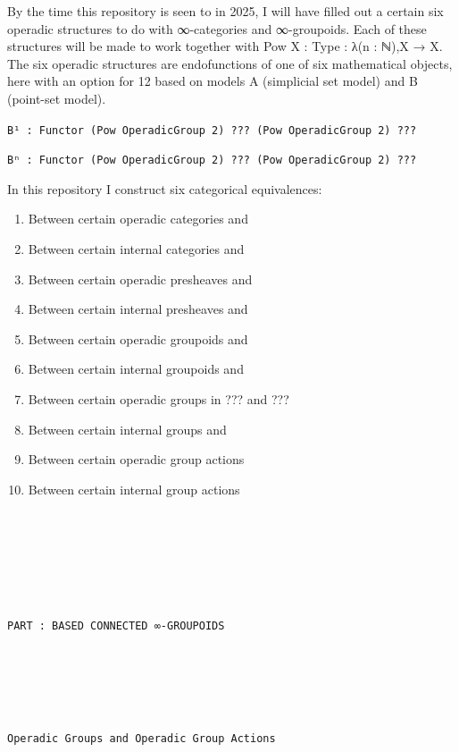 \documentclass{book}
\theoremstyle{definition}
\newcounter{pcounter}
\renewcommand{\chapter}[1]{
\newpage
{
\Huge 
\begin{center}
\ \\
\ \\
\thispagestyle{empty}
\texttt{#1}
\end{center}}
\ \\
\ \\
}
\newcounter{partcount}
\renewcommand{\part}[1]{
\newpage
{
\Huge 
\begin{center}
\ \\
\ \\
\ \\
\ \\
\ \\
\ \\
\thispagestyle{empty}
\texttt{PART {\thepartcount}: #1}
\stepcounter{partcount}
\end{center}}
\ \\
\ \\
}
\begin{document}
\newpage

By the time this repository is seen to in 2025, I will have filled out a certain six operadic structures to do with ∞-categories and ∞-groupoids. Each of these structures will be made to work together with Pow {X : Type} : λ(n : ℕ),X → X. The six operadic structures are endofunctions of one of six mathematical objects, here with an option for 12 based on models A (simplicial set model) and B (point-set model).

\begin{center}
\texttt{B¹ : Functor (Pow OperadicGroup 2) ??? (Pow OperadicGroup 2) ???}
\end{center}

\begin{center}
\texttt{Bⁿ : Functor (Pow OperadicGroup 2) ??? (Pow OperadicGroup 2) ???}
\end{center}

In this repository I construct six categorical equivalences:

\begin{enumerate}
\item Between certain operadic categories and 
\item Between certain internal categories and 
\item Between certain operadic presheaves and
\item Between certain internal presheaves and
\item Between certain operadic groupoids and 
\item Between certain internal groupoids and
\item Between certain operadic groups in ??? and ???
\item Between certain internal groups and 
\item Between certain operadic group actions
\item Between certain internal group actions
\end{enumerate}

\part{BASED CONNECTED ∞-GROUPOIDS}


\chapter{Operadic Groups and Operadic Group Actions}
\end{document}

